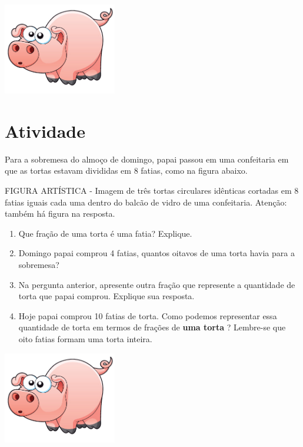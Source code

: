 \documentclass[a4,12pt]{book}
\begin{document}
\includegraphics[width=\textwidth,height=4cm, keepaspectratio]{pig}
\section{Atividade}







Para a sobremesa do almoço de domingo, papai passou em uma confeitaria em que as tortas estavam divididas em 8 fatias, como na figura abaixo. 

\begin{imagem*}[breakable]{}{}   FIGURA ARTÍSTICA - Imagem de três tortas circulares idênticas cortadas em 8 fatias iguais cada uma dentro do balcão de vidro de uma confeitaria. Atenção: também há figura na resposta.  
\end{imagem*}

\begin{enumerate} [\quad a)] %
  \item     Que fração de uma torta é uma fatia? Explique.
  \item     Domingo papai comprou 4 fatias, quantos oitavos de uma torta havia para a sobremesa?
  \item     Na pergunta anterior, apresente outra fração que represente a quantidade de torta que papai comprou. Explique sua resposta.
  \item     Hoje papai comprou 10 fatias de torta. Como podemos representar essa quantidade de torta em termos de frações de     {\bf uma torta}    ? Lembre-se que oito fatias formam uma torta inteira.
\end{enumerate} %






\includegraphics[width=\textwidth,height=4cm, keepaspectratio]{pig}
\end{document}
